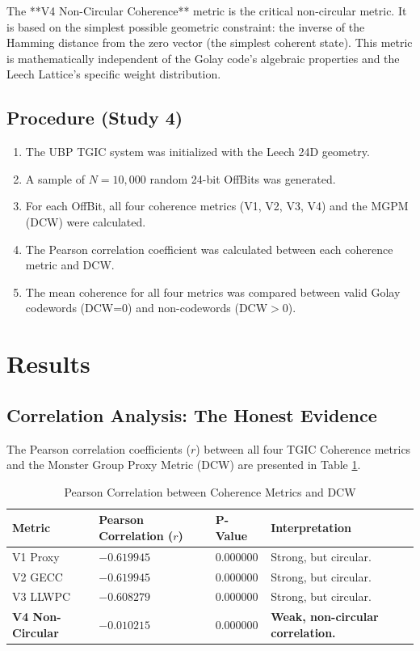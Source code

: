 \documentclass[10pt, a4paper]{article}
\begin{document}
The **V4 Non-Circular Coherence** metric is the critical non-circular metric. It is based on the simplest possible geometric constraint: the inverse of the Hamming distance from the zero vector (the simplest coherent state). This metric is mathematically independent of the Golay code's algebraic properties and the Leech Lattice's specific weight distribution.

\subsection{Procedure (Study 4)}

\begin{enumerate}
    \item The UBP TGIC system was initialized with the Leech 24D geometry.
    \item A sample of $N=10,000$ random 24-bit OffBits was generated.
    \item For each OffBit, all four coherence metrics (V1, V2, V3, V4) and the MGPM (DCW) were calculated.
    \item The Pearson correlation coefficient was calculated between each coherence metric and DCW.
    \item The mean coherence for all four metrics was compared between valid Golay codewords (DCW=0) and non-codewords (DCW$>0$).
\end{enumerate}

\section{Results}

\subsection{Correlation Analysis: The Honest Evidence}

The Pearson correlation coefficients ($r$) between all four TGIC Coherence metrics and the Monster Group Proxy Metric (DCW) are presented in Table \ref{tab:correlation}.

\begin{table}[h]
    \centering
    \caption{Pearson Correlation between Coherence Metrics and DCW}
    \label{tab:correlation}
    \begin{tabular}{llll}
        \toprule
        \textbf{Metric} & \textbf{Pearson Correlation ($r$)} & \textbf{P-Value} & \textbf{Interpretation} \\
        \midrule
        V1 Proxy & $-0.619945$ & $0.000000$ & Strong, but circular. \\
        V2 GECC & $-0.619945$ & $0.000000$ & Strong, but circular. \\
        V3 LLWPC & $-0.608279$ & $0.000000$ & Strong, but circular. \\
        \textbf{V4 Non-Circular} & $\mathbf{-0.010215}$ & $\mathbf{0.000000}$ & \textbf{Weak, non-circular correlation.} \\
        \bottomrule
    \end{tabular}
\end{table}
\end{document}
